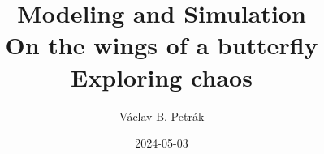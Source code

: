 \documentclass[11pt]{beamer}
\title{
Modeling and Simulation\\
\textbf{On the wings of a butterfly\\
Exploring chaos}}
\author{Václav B. Petrák}
\institute{Faculty of Biomedical Engineering\\
Czech Technical University}
\date{2024-05-03}
\begin{document}
\begin{frame}
  \titlepage
\end{frame}

\end{document}
